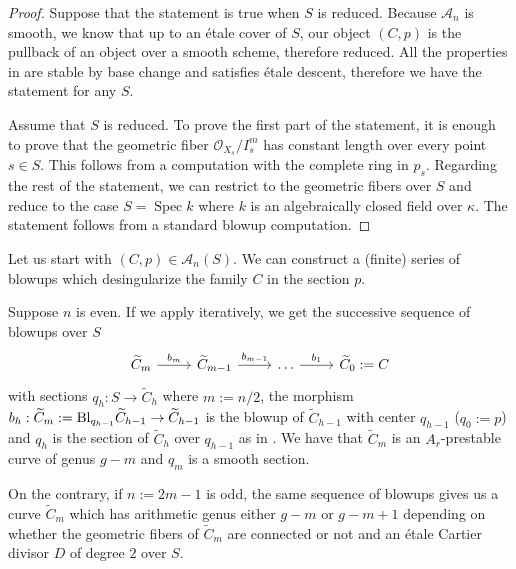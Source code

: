 \documentclass{alggeom}
\numberwithin{equation}{section}
\numberwithin{subsection}{section}
\theoremstyle{definition}
\theoremstyle{remark}
\newcommand\cA{\mathcal{A}} \newcommand\cB{\mathcal{B}}
\newcommand\cO{\mathcal{O}} \newcommand\cP{\mathcal{P}}
\newcommand\spec{\operatorname{Spec}}
\begin{document}
\begin{proof}
	Suppose that the statement is true when $S$ is reduced. Because $\cA_n$ is smooth, we know that up to an \'etale cover of $S$, our object $(C,p)$ is the pullback of an object over a smooth scheme, therefore reduced. All the properties in  are stable by base change and satisfies \'etale descent, therefore we have the statement for any $S$. 
	
	Assume that $S$ is reduced. To prove the first part of the statement, it is enough to prove that the geometric fiber $\cO_{X_s}/I_s^m$ has constant length over every point $s \in S$. This follows from a computation with the complete ring in $p_s$. Regarding the rest of the statement, we can restrict to the geometric fibers over $S$ and reduce to the case $S=\spec k$ where $k$ is an algebraically closed field over $\kappa$. The statement follows from a standard blowup computation.
\end{proof}

Let us start with $(C,p)\in \cA_n(S)$. We can construct a (finite) series of blowups which desingularize the family $C$ in the section $p$. 

Suppose $n$ is even. If we apply  iteratively, we get the successive sequence of blowups over $S$
$$ 
\begin{tikzcd}
	\widetilde{C}_m \arrow[r, "b_m"] & \widetilde{C}_{m-1} \arrow[r, "b_{m-1}"] & \dots \arrow[r, "b_1"] & \widetilde{C}_0:=C
\end{tikzcd}
$$
with sections $q_h:S \rightarrow \widetilde{C}_h$ where $m:=n/2$, the morphism $b_h:\widetilde{C}_m:={\rm Bl}_{q_{h-1}}\widetilde{C}_{h-1}\rightarrow \widetilde{C}_{h-1}$ is the blowup of $\widetilde{C}_{h-1}$ with center $q_{h-1}$ ($q_0:=p$) and $q_h$ is the section of $\widetilde{C}_h$ over $q_{h-1}$ as in . We have that $\widetilde{C}_m$ is an $A_r$-prestable curve of genus $g-m$ and $q_m$ is a smooth section. 

On the contrary, if $n:=2m-1$ is odd, the same sequence of blowups gives us a curve $\widetilde{C}_m$  which has arithmetic genus either $g-m$ or $g-m+1$ depending on whether the geometric fibers of $\widetilde{C}_m$ are connected or not and an  \'etale Cartier divisor $D$ of degree $2$ over $S$.
\end{document}
